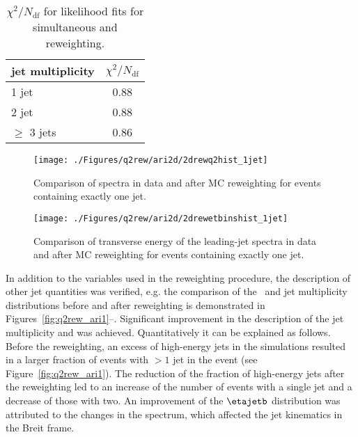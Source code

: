 \begin{table}%
\begin{center}
\begin{tabular}{l|c}
jet multiplicity & $\chi^2/N_\text{df}$ \\
\hline
1 jet & 0.88 \\
2 jet & 0.88 \\
$\geq$ 3 jets & 0.86 \\
\end{tabular}
\end{center}
\caption{$\chi^2/N_\text{df}$ for likelihood fits for simultaneous \qsq and \etjetb reweighting.}
\label{tab:chi2q2ariadnerew}
\end{table}

\begin{figure}[t!]%
\centering
\texttt{[image: ./Figures/q2rew/ari2d/2drewq2hist\_1jet]}%
\caption{Comparison of \qsq spectra in data and \ariadne after MC reweighting for events containing exactly one jet.}%
\label{fig:2dq2rew_q2_1jet}%
\end{figure}

\begin{figure}[p]%
\centering
\texttt{[image: ./Figures/q2rew/ari2d/2drewetbinshist\_1jet]}%
\caption{Comparison of transverse energy of the leading-jet spectra in data and \ariadne after MC reweighting for events containing exactly one jet.}%
\label{fig:2dq2rew_et_1jet}%
\end{figure}

In addition to the variables used in the reweighting procedure, the description of other jet quantities was verified, e.g. the comparison of the \etajetb~and jet multiplicity distributions before and after reweighting is demonstrated in Figures~\ref{fig:q2rew_ari1}--. Significant improvement in the description of the jet multiplicity and \etajetb was achieved. Quantitatively it can be explained as follows. Before the reweighting, an excess of high-energy jets in the simulations resulted in a larger fraction of events with $> 1$ jet in the event (see Figure~\ref{fig:q2rew_ari1}). The reduction of the fraction of high-energy jets after the reweighting led to an increase of the number of events with a single jet and a decrease of those with two. An improvement of the $\etajetb$ distribution was attributed to the changes in the \qsq spectrum, which affected the jet kinematics in the Breit frame.

